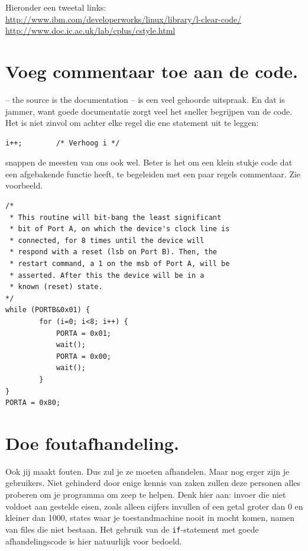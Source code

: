 \documentclass[12pt,a4paper,final,oneside,fleqn]{article}
\begin{document}
\noindent
Hieronder een tweetal links: \\
\url{http://www.ibm.com/developerworks/linux/library/l-clear-code/} \\
\url{http://www.doc.ic.ac.uk/lab/cplus/cstyle.html}


\section{Voeg commentaar toe aan de code.}
-- the source is the documentation -- is een veel gehoorde uitspraak. En dat is jammer,
want goede documentatie zorgt veel het sneller begrijpen van de code. Het is niet zinvol
om achter elke regel die ene statement uit te leggen:

\begin{lstlisting}[style=nonumbers,belowcaptionskip=-12pt]
i++;		/* Verhoog i */
\end{lstlisting}

\noindent
snappen de meesten van ons ook wel. Beter is het om een klein stukje code dat een
afgebakende functie heeft, te begeleiden met een paar regels commentaar. Zie voorbeeld.

\begin{lstlisting}[style=numbers,caption=Code met commentaar]
/*
 * This routine will bit-bang the least significant
 * bit of Port A, on which the device's clock line is
 * connected, for 8 times until the device will
 * respond with a reset (lsb on Port B). Then, the
 * restart command, a 1 on the msb of Port A, will be
 * asserted. After this the device will be in a
 * known (reset) state.
*/
while (PORTB&0x01) {
		for (i=0; i<8; i++) {
			PORTA = 0x01;
			wait();
			PORTA = 0x00;
			wait();
		}
}
PORTA = 0x80;
\end{lstlisting}

\section{Doe foutafhandeling.}
Ook jij maakt fouten. Dus zul je ze moeten afhandelen. Maar nog erger zijn je
gebruikers. Niet gehinderd door enige kennis van zaken zullen deze personen
alles proberen om je programma om zeep te helpen. Denk hier aan: invoer die niet
voldoet aan gestelde eisen, zoals alleen cijfers invullen of een getal groter dan
0 en kleiner dan 1000, states waar je toestandmachine nooit in mocht komen, namen
van files die niet bestaan. Het gebruik van de \texttt{if}-statement met goede
afhandelingscode is hier natuurlijk voor bedoeld.
\end{document}

